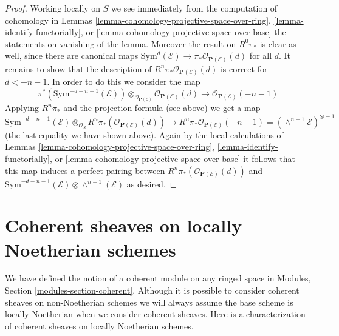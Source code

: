 \begin{proof}
\medskip\noindent
Working locally on $S$ we see immediately from the computation of
cohomology in Lemmas \ref{lemma-cohomology-projective-space-over-ring},
\ref{lemma-identify-functorially}, or
\ref{lemma-cohomology-projective-space-over-base} the statements on
vanishing of the lemma. Moreover the result on $R^0\pi_*$ is clear
as well, since there are canonical maps
$\text{Sym}^d(\mathcal{E}) \to \pi_* \mathcal{O}_{\mathbf{P}(\mathcal{E})}(d)$
for all $d$. It remains to show that the description of
$R^n\pi_*\mathcal{O}_{\mathbf{P}(\mathcal{E})}(d)$ is correct
for $d < -n - 1$. In order to do this we consider the map
$$
\pi^*(\text{Sym}^{-d - n - 1}(\mathcal{E}))
\otimes_{\mathcal{O}_{\mathbf{P}(\mathcal{E})}}
\mathcal{O}_{\mathbf{P}(\mathcal{E})}(d)
\longrightarrow
\mathcal{O}_{\mathbf{P}(\mathcal{E})}(-n - 1)
$$
Applying $R^n\pi_*$ and the projection formula (see above) we get a map
$$
\text{Sym}^{-d - n - 1}(\mathcal{E})
\otimes_{\mathcal{O}_S}
R^n\pi_*(\mathcal{O}_{\mathbf{P}(\mathcal{E})}(d))
\longrightarrow
R^n\pi_*\mathcal{O}_{\mathbf{P}(\mathcal{E})}(-n - 1) =
(\wedge^{n + 1}\mathcal{E})^{\otimes -1}
$$
(the last equality we have shown above).
Again by the local calculations of Lemmas
\ref{lemma-cohomology-projective-space-over-ring},
\ref{lemma-identify-functorially}, or
\ref{lemma-cohomology-projective-space-over-base}
it follows that this map induces a perfect pairing between
$R^n\pi_*(\mathcal{O}_{\mathbf{P}(\mathcal{E})}(d))$ and
$\text{Sym}^{-d - n - 1}(\mathcal{E}) \otimes \wedge^{n + 1}(\mathcal{E})$
as desired.
\end{proof}

















\section{Coherent sheaves on locally Noetherian schemes}
\label{section-coherent-sheaves}

\noindent
We have defined the notion of a coherent module on any ringed space in
Modules, Section \ref{modules-section-coherent}.
Although it is possible to consider coherent sheaves on non-Noetherian
schemes we will always assume the base scheme is locally Noetherian when
we consider coherent sheaves. Here is a characterization of coherent
sheaves on locally Noetherian schemes.

